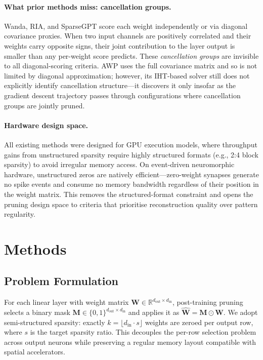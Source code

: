 \documentclass{article}
\begin{document}
\paragraph{What prior methods miss: cancellation groups.}
Wanda, RIA, and SparseGPT score each weight independently or via diagonal
covariance proxies. When two input channels are positively correlated and
their weights carry opposite signs, their joint contribution to the layer
output is smaller than any per-weight score predicts. These \emph{cancellation
groups} are invisible to all diagonal-scoring criteria. AWP uses the full
covariance matrix and so is not limited by diagonal approximation; however,
its IHT-based solver still does not explicitly identify cancellation structure---it
discovers it only insofar as the gradient descent trajectory passes through
configurations where cancellation groups are jointly pruned.

\paragraph{Hardware design space.}
All existing methods were designed for GPU execution models, where throughput
gains from unstructured sparsity require highly structured formats (e.g., 2:4
block sparsity) to avoid irregular memory access. On event-driven neuromorphic
hardware, unstructured zeros are natively efficient---zero-weight synapses
generate no spike events and consume no memory bandwidth regardless of their
position in the weight matrix. This removes the structured-format constraint
and opens the pruning design space to criteria that prioritise reconstruction
quality over pattern regularity.


\section{Methods}
\label{sec:methods}

\subsection{Problem Formulation}

For each linear layer with weight matrix
$\mathbf{W} \in \mathbb{R}^{d_\text{out} \times d_\text{in}}$, post-training
pruning selects a binary mask
$\mathbf{M} \in \{0,1\}^{d_\text{out} \times d_\text{in}}$ and applies it as
$\hat{\mathbf{W}} = \mathbf{M} \odot \mathbf{W}$.
We adopt semi-structured sparsity: exactly
$k = \lfloor d_\text{in} \cdot s \rfloor$ weights are zeroed per output row,
where $s$ is the target sparsity ratio. This decouples the per-row selection
problem across output neurons while preserving a regular memory layout
compatible with spatial accelerators.
\end{document}

